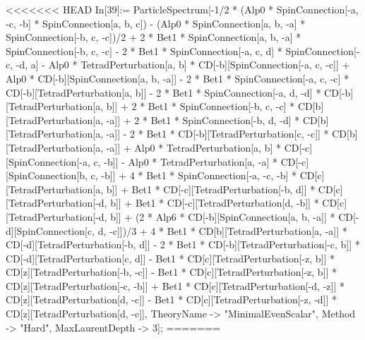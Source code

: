 <<<<<<< HEAD
In[39]:= ParticleSpectrum[-1/2 * (Alp0 * SpinConnection[-a, -c, -b] * SpinConnection[a, b, c]) - (Alp0 * SpinConnection[a, b, -a] * SpinConnection[-b, c, -c])/2 + 2 * Bet1 * SpinConnection[a, b, -a] * SpinConnection[-b, c, -c] - 2 * Bet1 * SpinConnection[-a, c, d] * SpinConnection[-c, -d, a] - Alp0 * TetradPerturbation[a, b] * CD[-b][SpinConnection[-a, c, -c]] + Alp0 * CD[-b][SpinConnection[a, b, -a]] - 2 * Bet1 * SpinConnection[-a, c, -c] * CD[-b][TetradPerturbation[a, b]] - 2 * Bet1 * SpinConnection[-a, d, -d] * CD[-b][TetradPerturbation[a, b]] + 2 * Bet1 * SpinConnection[-b, c, -c] * CD[b][TetradPerturbation[a, -a]] + 2 * Bet1 * SpinConnection[-b, d, -d] * CD[b][TetradPerturbation[a, -a]] - 2 * Bet1 * CD[-b][TetradPerturbation[c, -c]] * CD[b][TetradPerturbation[a, -a]] + Alp0 * TetradPerturbation[a, b] * CD[-c][SpinConnection[-a, c, -b]] - Alp0 * TetradPerturbation[a, -a] * CD[-c][SpinConnection[b, c, -b]] + 4 * Bet1 * SpinConnection[-a, -c, -b] * CD[c][TetradPerturbation[a, b]] + Bet1 * CD[-c][TetradPerturbation[-b, d]] * CD[c][TetradPerturbation[-d, b]] + Bet1 * CD[-c][TetradPerturbation[d, -b]] * CD[c][TetradPerturbation[-d, b]] + (2 * Alp6 * CD[-b][SpinConnection[a, b, -a]] * CD[-d][SpinConnection[c, d, -c]])/3 + 4 * Bet1 * CD[b][TetradPerturbation[a, -a]] * CD[-d][TetradPerturbation[-b, d]] - 2 * Bet1 * CD[-b][TetradPerturbation[-c, b]] * CD[-d][TetradPerturbation[c, d]] - Bet1 * CD[c][TetradPerturbation[-z, b]] * CD[z][TetradPerturbation[-b, -c]] - Bet1 * CD[c][TetradPerturbation[-z, b]] * CD[z][TetradPerturbation[-c, -b]] + Bet1 * CD[c][TetradPerturbation[-d, -z]] * CD[z][TetradPerturbation[d, -c]] - Bet1 * CD[c][TetradPerturbation[-z, -d]] * CD[z][TetradPerturbation[d, -c]], TheoryName -> "MinimalEvenScalar", Method -> "Hard", MaxLaurentDepth -> 3]; 
=======
